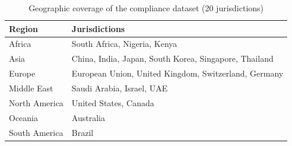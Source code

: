 \begin{table}[htbp]
\centering
\caption{Geographic coverage of the compliance dataset (20 jurisdictions)}
\label{tab:coverage}
\begin{tabularx}{\textwidth}{@{}l X@{}}
\toprule
\textbf{Region} & \textbf{Jurisdictions} \\
\midrule
Africa & South Africa, Nigeria, Kenya \\
Asia & China, India, Japan, South Korea, Singapore, Thailand \\
Europe & European Union, United Kingdom, Switzerland, Germany \\
Middle East & Saudi Arabia, Israel, UAE \\
North America & United States, Canada \\
Oceania & Australia \\
South America & Brazil \\
\bottomrule
\end{tabularx}
\end{table}
